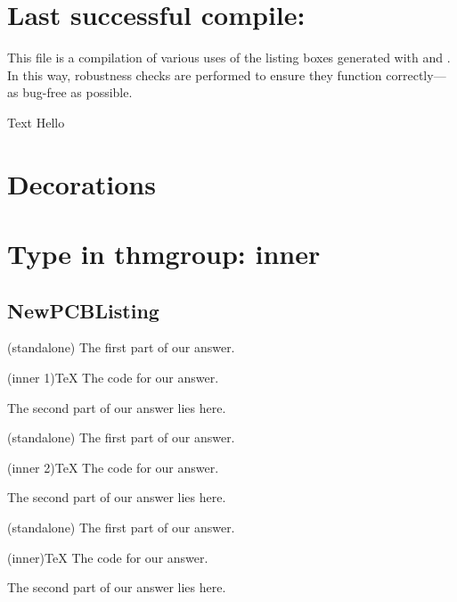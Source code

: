 \documentclass[11pt, titlepage, a4paper, oneside]{book}
\begin{document}
\frontmatter
\chapter*{Last successful compile: \DTMnow}

This file is a compilation of various uses of the listing boxes generated with  and . In this way, robustness checks are performed to ensure they function correctly---as bug-free as possible.
\begin{code}[debug=autowidth]{Text}
    Hello
\end{code}
%
\tableofcontents
\thispagestyle{empty}
\newpage
\setcounter{page}{1}
%
\mainmatter
\chapter{Decorations}


\chapter{Type in thmgroup: inner}
\section{NewPCBListing}
\begin{answer}(standalone)
    The first part of our answer.
    \begin{code}(inner 1){\TeX}
        The code for our answer.
    \end{code}
    \hspace{-\parindent-4mm} The second part of our answer lies here.
\end{answer}
\begin{answer}(standalone)
    The first part of our answer.
    \begin{code}(inner 2){\TeX}
        The code for our answer.
    \end{code}
    \hspace{-\parindent-4mm} The second part of our answer lies here.
\end{answer}
\begin{answer}(standalone)
    The first part of our answer.
    \begin{code}(inner){\TeX}
        The code for our answer.
    \end{code}
    \hspace{-\parindent-4mm} The second part of our answer lies here.
\end{answer}
\end{document}
